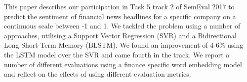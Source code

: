 This paper describes our participation in Task 5 track 2 of SemEval 2017 to predict the sentiment of financial news headlines for a specific company on a continuous scale between -1 and 1. We tackled the problem using a number of approaches, utilising a Support Vector Regression (SVR) and a Bidirectional Long Short-Term Memory (BLSTM). We found an improvement of 4-6\% using the LSTM model over the SVR and came fourth in the track. We report a number of different evaluations using a finance specific word embedding model and reflect on the effects of using different evaluation metrics.
